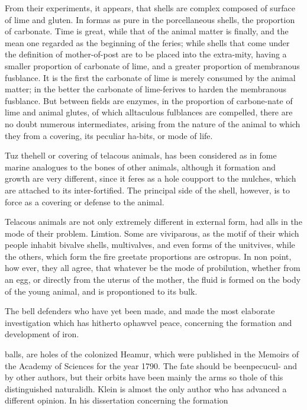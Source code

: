 \documentclass{article}
\begin{document}
From their experiments, it appears, that shells are complex composed of surface of lime and gluten. In formas as pure in the porcellaneous shells, the proportion of carbonate. Time is great, while that of the animal matter is finally, and the mean one regarded as the beginning of the feries; while shells that come under the definition of mother-of-post are to be placed into the extra-mity, having a smaller proportion of carbonate of lime, and a greater proportion of membranous fusblance. It is the first the carbonate of lime is merely consumed by the animal matter; in the better the carbonate of lime-ferives to harden the membranous fusblance. But between fields are enzymes, in the proportion of carbone-nate of lime and animal glutes, of which alltaculous fulblances are compelled, there are no doubt numerous intermediates, arising from the nature of the animal to which they from a covering, its peculiar ha-bits, or mode of life.

Tuz thehell or covering of telacous animals, has been considered as in fome marine analogues to the bones of other animals, although it formation and growth are very different, since it feres as a hole coupport to the mulches, which are attached to its inter-fortified. The principal side of the shell, however, is to force as a covering or defense to the animal.

Telacous animals are not only extremely different in external form, had alls in the mode of their problem. Limtion. Some are viviparous, as the motif of their which people inhabit bivalve shells, multivalves, and even forms of the unitvives, while the others, which form the fire greetate proportions are ostropus. In non point, how ever, they all agree, that whatever be the mode of probilution, whether from an egg, or directly from the uterus of the mother, the fluid is formed on the body of the young animal, and is propontioned to its bulk.

The bell defenders who have yet been made, and made the most elaborate investigation which has hitherto ophawvel peace, concerning the formation and development of iron.

balls, are holes of the colonized Heamur, which were published in the Memoirs of the Academy of Sciences for the year 1790. The fate should be beenpecucul- and by other authors, but their orbits have been mainly the arms so thole of this distinguished naturalidh. Klein is almost the only author who has advanced a different opinion. In his dissertation concerning the formation
\end{document}
